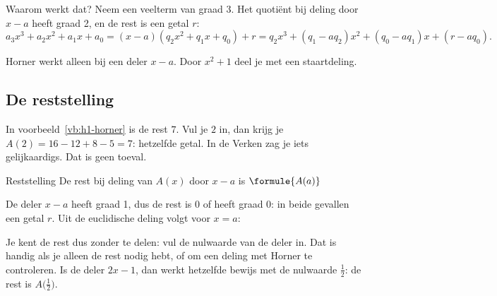 Waarom werkt dat? Neem een veelterm van graad 3. Het quotiënt bij deling door $x - a$ heeft graad 2, en de rest is een getal $r$:
\[a_3x^3 + a_2x^2 + a_1x + a_0 = (x - a)(q_2x^2 + q_1x + q_0) + r = q_2x^3 + (q_1 - aq_2)x^2 + (q_0 - aq_1)x + (r - aq_0) .\]

Horner werkt alleen bij een deler $x - a$. Door $x^2 + 1$ deel je met een staartdeling.

\begin{oefeningen}
\end{oefeningen}

\subsection{De reststelling}

In voorbeeld~\ref{vb:h1-horner} is de rest $7$. Vul je $2$ in, dan krijg je $A(2) = 16 - 12 + 8 - 5 = 7$: hetzelfde getal. In de Verken zag je iets gelijkaardigs. Dat is geen toeval.

\begin{theorie}
\begin{stelling}{Reststelling}
De rest bij deling van $A(x)$ door $x - a$ is \quad $\formule{A(a)}$
\end{stelling}

\begin{bewijs}
De deler $x - a$ heeft graad 1, dus de rest is $0$ of heeft graad 0: in beide gevallen een getal $r$. Uit de euclidische deling
volgt voor $x = a$:
\end{bewijs}
\end{theorie}

Je kent de rest dus zonder te delen: vul de nulwaarde van de deler in. Dat is handig als je alleen de rest nodig hebt, of om een deling met Horner te controleren. Is de deler $2x - 1$, dan werkt hetzelfde bewijs met de nulwaarde $\frac12$: de rest is $A\bigl(\frac12\bigr)$.

